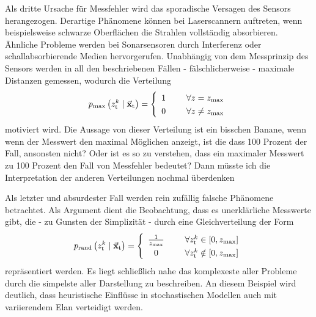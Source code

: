 Als dritte Ursache für Messfehler wird das sporadische Versagen des Sensors herangezogen. Derartige Phänomene können bei Laserscannern auftreten, wenn beispielsweise schwarze Oberflächen die Strahlen vollständig absorbieren. Ähnliche Probleme werden bei Sonarsensoren durch Interferenz oder schallabsorbierende Medien hervorgerufen. Unabhängig von dem Messprinzip des Sensors werden in all den beschriebenen Fällen - fälschlicherweise - maximale Distanzen gemessen, wodurch die Verteilung
\begin{equation}
p\idx{max}\left(z^k\idx{t} \mCond \mVec{x}\idx{t}\right) = \left\{ \begin{array}{cl}
1 & \hspace{5mm} \forall z = z\idx{max} \\
0 & \hspace{5mm} \forall z  \neq z\idx{max}
\end{array}\right.
\end{equation}
motiviert wird. {\color{red} Die Aussage von dieser Verteilung ist ein bisschen Banane, wenn wenn der Messwert den maximal Möglichen anzeigt, ist die dass 100 Prozent der Fall, ansonsten nicht? Oder ist es so zu verstehen, dass ein maximaler Messwert zu 100 Prozent den Fall von Messfehler bedeutet? Dann müsste ich die Interpretation der anderen Verteilungen nochmal überdenken}

Als letzter und absurdester Fall werden rein zufällig falsche Phänomene betrachtet. Als Argument dient die Beobachtung, dass es unerklärliche Messwerte gibt, die - zu Gunsten der Simplizität - durch eine Gleichverteilung der Form
\begin{equation}
\renewcommand*{\arraystretch}{1.3}
p\idx{rand}\left( z^k\idx{t} \mCond \mVec{x}\idx{t}\right) = \left\{ \begin{array}{cl}
\frac{1}{z\idx{max}} & \hspace{5mm} \forall z^k\idx{t} \in \left[0, z\idx{max}\right] 
\\
0 & \hspace{5mm} \forall z^k\idx{t} \notin \left[0, z\idx{max}\right]
\end{array} \right.
\end{equation}
repräsentiert werden. Es liegt schließlich nahe das komplexeste aller Probleme durch die simpelste aller Darstellung zu beschreiben. An diesem Beispiel wird deutlich, dass heuristische Einflüsse in stochastischen Modellen auch mit variierendem Elan verteidigt werden.

